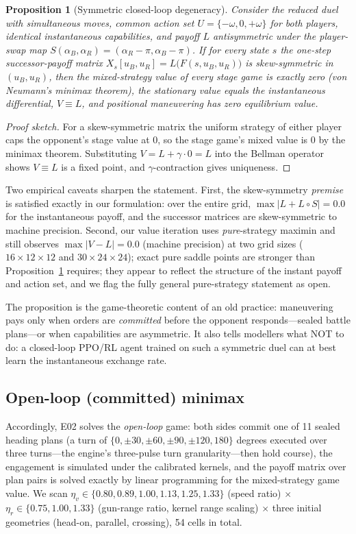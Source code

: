 \documentclass[12pt,a4paper]{article}
\newtheorem{proposition}{Proposition}
\newcommand{\etav}{\eta_v}
\newcommand{\etar}{\eta_r}
\begin{document}
\begin{proposition}[Symmetric closed-loop degeneracy]\label{prop:deg}
Consider the reduced duel with simultaneous moves, common action set
$U=\{-\omega,0,+\omega\}$ for both players, identical instantaneous
capabilities, and payoff $L$ antisymmetric under the player-swap map
$S(\alpha_B,\alpha_R)=(\alpha_R-\pi,\alpha_B-\pi)$.  If for every state
$s$ the one-step successor-payoff matrix
$X_s[u_B,u_R]=L\big(F(s,u_B,u_R)\big)$ is skew-symmetric in $(u_B,u_R)$,
then the \emph{mixed-strategy} value of every stage game is exactly zero
(von Neumann's minimax theorem), the stationary value equals the
instantaneous differential, $V\equiv L$, and positional maneuvering has
zero equilibrium value.
\end{proposition}
\begin{proof}[Proof sketch]
For a skew-symmetric matrix the uniform strategy of either player caps the
opponent's stage value at $0$, so the stage game's mixed value is $0$ by
the minimax theorem.  Substituting $V=L+\gamma\cdot 0=L$ into the Bellman
operator shows $V\equiv L$ is a fixed point, and $\gamma$-contraction
gives uniqueness.
\end{proof}

Two empirical caveats sharpen the statement.  First, the skew-symmetry
\emph{premise} is satisfied exactly in our formulation: over the entire
grid, $\max|L+L\circ S|=0.0$ for the instantaneous payoff, and the
successor matrices are skew-symmetric to machine precision.  Second, our
value iteration uses \emph{pure}-strategy maximin and still observes
$\max|V-L|=0.0$ (machine precision) at two grid sizes
($16\times12\times12$ and $30\times24\times24$); exact pure saddle
points are stronger than Proposition~\ref{prop:deg} requires; they
appear to reflect the structure of the instant payoff and action set, and
we flag the fully general pure-strategy statement as open.  

  The proposition is the
game-theoretic content of an old practice: maneuvering pays only when
orders are \emph{committed} before the opponent responds---sealed battle
plans---or when capabilities are asymmetric.  It also tells modellers what
NOT to do: a closed-loop PPO/RL agent trained on such a symmetric duel can
at best learn the instantaneous exchange rate.

\subsection{Open-loop (committed) minimax}
Accordingly, E02 solves the \emph{open-loop} game: both sides commit one of
11 sealed heading plans (a turn of $\{0,\pm30,\pm60,\pm90,\pm120,180\}$
degrees executed over three turns---the engine's three-pulse turn
granularity---then hold course), the engagement is simulated under the
calibrated kernels, and the payoff matrix over plan pairs is solved exactly
by linear programming for the mixed-strategy game value.  We scan
$\etav\in\{0.80,0.89,1.00,1.13,1.25,1.33\}$ (speed ratio) $\times$
$\etar\in\{0.75,1.00,1.33\}$ (gun-range ratio, kernel range scaling)
$\times$ three initial geometries (head-on, parallel, crossing),
54 cells in total.
\end{document}
